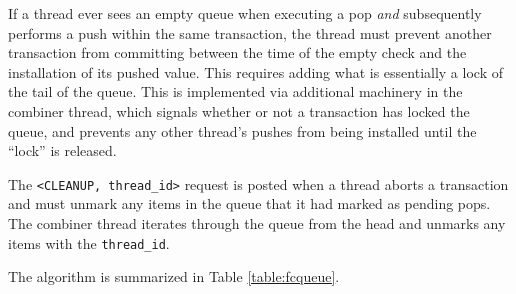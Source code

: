 If a thread ever sees an empty queue when executing a pop \emph{and} subsequently performs a push within the same transaction, the thread must prevent another transaction from committing between the time of the empty check and the installation of its pushed value. This requires adding what is essentially a lock of the tail of the queue. This is implemented via additional machinery in the combiner thread, which signals whether or not a transaction has locked the queue, and prevents any other thread's pushes from being installed until the ``lock'' is released.

The \texttt{<CLEANUP, thread\_id>} request is posted when a thread aborts a transaction and must unmark any items in the queue that it had marked as pending pops. The combiner thread iterates through the queue from the head and unmarks any items with the \texttt{thread\_id}.

The algorithm is summarized in Table \ref{table:fcqueue}.

%


